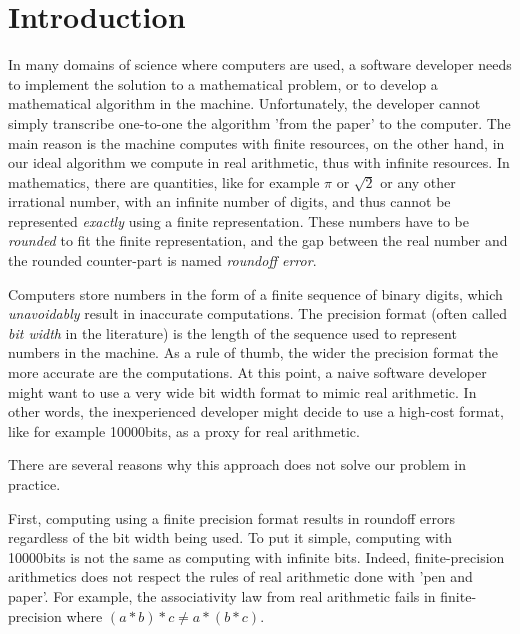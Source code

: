 
\chapter{Introduction}

\setupuuchapterbib
%
In many domains of science where computers are used, a software developer needs to implement the solution to a mathematical problem, or to develop a mathematical algorithm in the machine.
%
Unfortunately, the developer cannot simply transcribe one-to-one the algorithm 'from the paper' to the computer.
%
%
The main reason is the machine computes with finite resources, on the other hand, in our ideal algorithm we compute in real arithmetic, thus with infinite resources.
%
In mathematics, there are quantities, like for example $\pi$ or $\sqrt{2}$ or any other irrational number, with an infinite number of digits, and thus cannot be represented \emph{exactly} using a finite representation.
%
These numbers have to be \emph{rounded} to fit the finite representation, and the gap between the real number and the rounded counter-part is named \emph{roundoff error}.

%
Computers store numbers in the form of a finite sequence of binary digits, which \emph{unavoidably} result in inaccurate computations.
%
The precision format (often called \emph{bit width} in the literature) is the length of the sequence used to represent numbers in the machine.
%
As a rule of thumb, the wider the precision format the more accurate are the computations.
%
At this point, a naive software developer might want to use a very wide bit width format to mimic real arithmetic. 
%
In other words, the inexperienced developer might decide to use a high-cost format, like for example 10000bits, as a proxy for real arithmetic.
%

There are several reasons why this approach does not solve our problem in practice.
%

First, computing using a finite precision format results in roundoff errors regardless of the bit width being used.
%
To put it simple, computing with 10000bits is not the same as computing with infinite bits.
%
Indeed, finite-precision arithmetics does not respect the rules of real arithmetic done with 'pen and paper'.
%
For example, the associativity law from real arithmetic fails in finite-precision where $(a*b)*c \ne a*(b*c)$.

